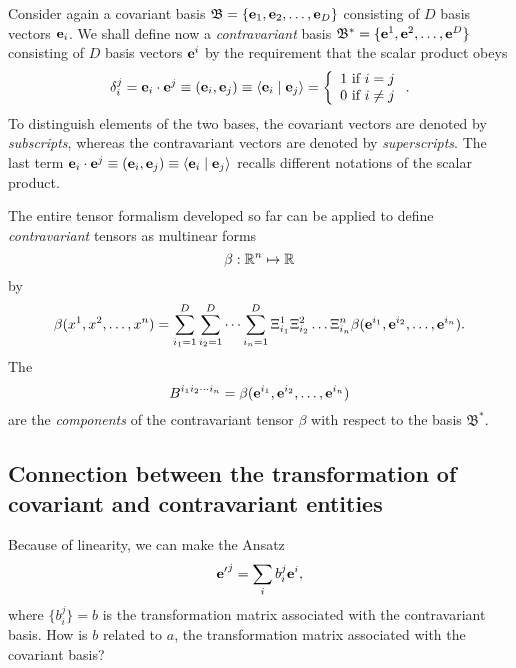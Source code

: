 Consider again a covariant basis
${\mathfrak B}=\{{\bf e}_1,{\bf e}_2,\ldots ,{\bf e}_D\}$ consisting of
$D$ basis vectors ${\bf e}_i$.
We shall define now a {\em contravariant} basis
${\mathfrak B^\ast}=\{{\bf e}^1,{\bf e}^2,\ldots ,{\bf e}^D\}$ consisting of
$D$ basis vectors ${\bf e}^i$
by the requirement that the scalar product obeys
\begin{equation}
\delta_i^j = {\bf e}_i\cdot {\bf e}^j\equiv ({\bf e}_i,{\bf e}_j)\equiv \langle {\bf e}_i\mid {\bf e}_j\rangle
 =\left\{
 \begin{array}{l}
1 \mbox{ if } i=j \\
0 \mbox{ if } i\neq j  \\
\end{array}
 \right. .
\label{2001-mu-tensors0}
\end{equation}
To distinguish elements of the two bases, the covariant vectors are denoted by {\em subscripts},
whereas the contravariant vectors are denoted by {\em superscripts}.
The last term ${\bf e}_i\cdot {\bf e}^j\equiv ({\bf e}_i,{\bf e}_j)\equiv \langle {\bf e}_i\mid {\bf e}_j\rangle $
recalls different notations of the scalar product.

The entire tensor formalism developed so far can be applied to define {\em contravariant} tensors
as multinear forms
\begin{equation}
\beta:{\Bbb R}^n \mapsto {\Bbb R}
\end{equation}
by
\begin{equation}
\beta ( x^1,x^2,\ldots ,x^n)=
\sum_{i_1=1}^D
\sum_{i_2=1}^D
\cdots
\sum_{i_n=1}^D
\Xi_{i_1}^1 \Xi_{i_2}^2\ldots \Xi_{i_n}^n
\beta ( {\bf e}^{i_1},{\bf e}^{i_2},\ldots ,{\bf e}^{i_n}).
\end{equation}
The
\begin{equation}
B^{{i_1}{i_2}\cdots {i_n}}=\beta ( {\bf e}^{i_1},{\bf e}^{i_2},\ldots ,{\bf e}^{i_n})
\end{equation}
 are the
{\em components} of the contravariant tensor $\beta $ with respect to the basis
${\mathfrak B}^\ast$.

\subsection{Connection between the transformation of covariant and contravariant entities}

Because of linearity, we can make the Ansatz
\begin{equation}
{{\bf e}'}^j=\sum_ib_i^j{\bf e}^i,
\end{equation}
where $\{b_i^j\}=b$ is
the transformation matrix associated with the contravariant basis.
How is $b$ related to $a$,
the transformation matrix associated with the covariant basis?

